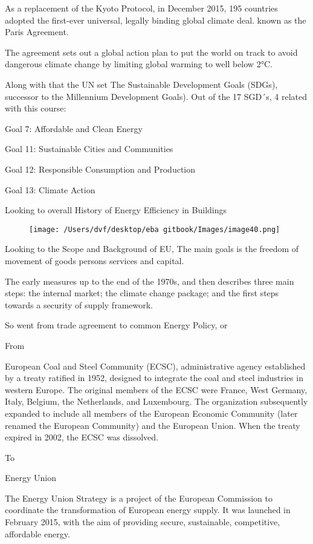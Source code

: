 \documentclass[]{book}
\theoremstyle{definition}
\theoremstyle{definition}
\theoremstyle{definition}
\theoremstyle{remark}
\begin{document}
As a replacement of the Kyoto Protocol, in December 2015, 195 countries
adopted the first-ever universal, legally binding global climate deal.
known as the Paris Agreement.

The agreement sets out a global action plan to put the world on track to
avoid dangerous climate change by limiting global warming to well below
2°C.

Along with that the UN set The Sustainable Development Goals (SDGs),
successor to the Millennium Development Goals). Out of the 17 SGD´s, 4
related with this course:

Goal 7: Affordable and Clean Energy

Goal 11: Sustainable Cities and Communities

Goal 12: Responsible Consumption and Production

Goal 13: Climate Action

Looking to overall History of Energy Efficiency in Buildings

\begin{figure}[htbp]
\centering
\texttt{[image: /Users/dvf/desktop/eba gitbook/Images/image40.png]}
\caption{}
\end{figure}

Looking to the Scope and Background of EU, The main goals is the freedom
of movement of goods persons services and capital.

The early measures up to the end of the 1970s, and then describes three
main steps: the internal market; the climate change package; and the
first steps towards a security of supply framework.

So went from trade agreement to common Energy Policy, or

From

European Coal and Steel Community (ECSC), administrative agency
established by a treaty ratified in 1952, designed to integrate the coal
and steel industries in western Europe. The original members of the ECSC
were France, West Germany, Italy, Belgium, the Netherlands, and
Luxembourg. The organization subsequently expanded to include all
members of the European Economic Community (later renamed the European
Community) and the European Union. When the treaty expired in 2002, the
ECSC was dissolved.

To

Energy Union

The Energy Union Strategy is a project of the European Commission to
coordinate the transformation of European energy supply. It was launched
in February 2015, with the aim of providing secure, sustainable,
competitive, affordable energy.
\end{document}
